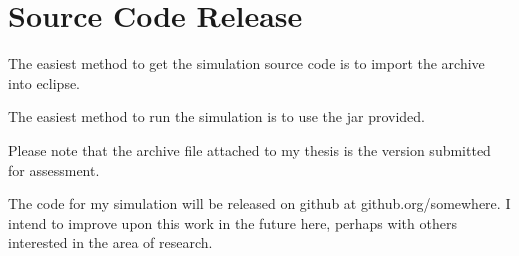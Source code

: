 \documentclass[a4paper,11pt,bcshonoursthesis,singlespace,twoside,thesisdraft,pdflatex]{cssethesis}
\begin{document}
\chapter{Source Code Release}
\label{app:code}
The easiest method to get the simulation source code is to import the archive into eclipse.

The easiest method to run the simulation is to use the jar provided. 

Please note that the archive file attached to my thesis is the version submitted for assessment. 

The code for my simulation will be released on github at github.org/somewhere. 
I intend to improve upon this work in the future here, perhaps with others interested in the area of research. 





\end{document}
